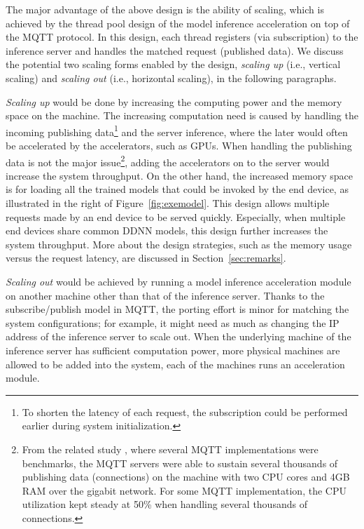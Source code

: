 \documentclass[format=acmsmall, review=false, screen=true]{acmart}
\def\figurename{Figure}
\begin{document}
The major advantage of the above design is the ability of scaling, which is achieved by the thread pool design of the model inference acceleration on top of the MQTT protocol. In this design, each thread registers (via subscription) to the inference server and handles the matched request (published data). We discuss the potential two scaling forms enabled by the design, \emph{scaling up} (i.e., vertical scaling) and \emph{scaling out} (i.e., horizontal scaling), in the following paragraphs.

\emph{Scaling up} would be done by increasing the computing power and the memory space on the machine. %
The increasing computation need is caused by handling the incoming publishing data\footnote{To shorten the latency of each request, the subscription could be performed earlier during system initialization.}%
and the server inference, where the later would often be accelerated by the accelerators, such as GPUs. When handling the publishing data is not the major issue\footnote{From the related study \cite{mqttbenchmark15}, where several MQTT implementations were benchmarks, the MQTT servers were able to sustain several thousands of publishing data (connections) on the machine with two CPU cores and 4GB RAM over the gigabit network. For some MQTT implementation, the CPU utilization kept steady at 50\% when handling several thousands of connections.}, adding the accelerators on to the server would increase the system throughput.
On the other hand, the increased memory space is for loading all the trained models that could be invoked by the end device, as illustrated in the right of \figurename~\ref{fig:exemodel}. This design allows multiple requests made by an end device to be served quickly. Especially, when multiple end devices share common DDNN models, this design further increases the system throughput. More about the design strategies, such as the memory usage versus the request latency, are discussed in Section~\ref{sec:remarks}.

\emph{Scaling out} would be achieved by running a model inference acceleration module on another machine other than that of the inference server. Thanks to the subscribe/publish model in MQTT, the porting effort is minor for matching the system configurations; for example, it might need as much as changing the IP address of the inference server to scale out. When the underlying machine of the inference server has sufficient computation power, more physical machines are allowed to be added into the system, each of the machines runs an acceleration module.
\end{document}
